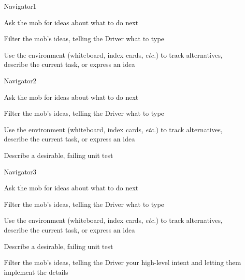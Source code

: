 \documentclass[20pt]{extarticle}
\begin{document}
\begin{role}{Navigator}{1}
  \item Ask the mob for ideas about what to do next
  \item Filter the mob's ideas, telling the Driver what to type
  \item Use the environment (whiteboard, index cards, \textit{etc.}) to
    track alternatives, describe the current task, or express
    an idea
\end{role}

\begin{role}{Navigator}{2}
  \item Ask the mob for ideas about what to do next
  \item Filter the mob's ideas, telling the Driver what to type
  \item Use the environment (whiteboard, index cards, \textit{etc.}) to
    track alternatives, describe the current task, or express
    an idea
  \item Describe a desirable, failing unit test
\end{role}

\begin{role}{Navigator}{3}
  \item Ask the mob for ideas about what to do next
  \item Filter the mob's ideas, telling the Driver what to type
  \item Use the environment (whiteboard, index cards, \textit{etc.}) to
    track alternatives, describe the current task, or express
    an idea
  \item Describe a desirable, failing unit test
  \item Filter the mob's ideas, telling the Driver your high-level
    intent and letting them implement the details
\end{role}
\end{document}
